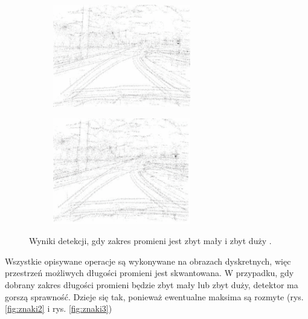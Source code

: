 
\begin{figure}[h]
	\centering
	\begin{subfigure}{0.35\textwidth}
		\centering
		\includegraphics[width=6cm]{img/znaki2.png}
		\subcaption{\label{fig:znaki2}}
	\end{subfigure}
	\begin{subfigure}{0.35\textwidth}
		\centering
		\includegraphics[width=6cm]{img/znaki3.png}
		\subcaption{\label{fig:znaki3}}
	\end{subfigure}
	
	\caption{\label{fig:details}Wyniki detekcji, gdy zakres promieni jest zbyt mały \protect{} i zbyt duży \protect{}.\cite{T2}}
\end{figure}

Wszystkie opisywane operacje są wykonywane na obrazach dyskretnych, więc przestrzeń możliwych długości promieni jest skwantowana. W przypadku, gdy dobrany zakres długości promieni będzie zbyt mały lub zbyt duży, detektor ma gorszą sprawność. Dzieje się tak, ponieważ ewentualne maksima są rozmyte (rys. \ref{fig:znaki2} i rys. \ref{fig:znaki3})

